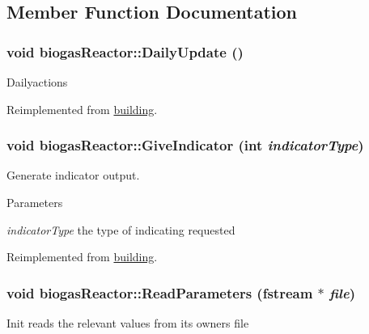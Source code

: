\subsection{Member Function Documentation}
\hypertarget{classbiogas_reactor_ae8242ee2ab7dd6495125af9720b54aa4}{
\subsubsection[{DailyUpdate}]{\setlength{\rightskip}{0pt plus 5cm}void biogasReactor::DailyUpdate ()}}
\label{classbiogas_reactor_ae8242ee2ab7dd6495125af9720b54aa4}
Dailyactions 

Reimplemented from \hyperlink{classbuilding_a584ba300427d2a648f478b68065b7a18}{building}.\hypertarget{classbiogas_reactor_ab2482d657ec9095da5aef508d0841e0e}{
\subsubsection[{GiveIndicator}]{\setlength{\rightskip}{0pt plus 5cm}void biogasReactor::GiveIndicator (int {\em indicatorType})}}
\label{classbiogas_reactor_ab2482d657ec9095da5aef508d0841e0e}


Generate indicator output. 
\begin{DoxyParams}{Parameters}
\item[{\em indicatorType}]the type of indicating requested \end{DoxyParams}


Reimplemented from \hyperlink{classbuilding_ae0e21d6fc26978c65a980676ddf4fcdf}{building}.\hypertarget{classbiogas_reactor_aafc4e774b0d67a08d3f55c566e5a58b7}{
\subsubsection[{ReadParameters}]{\setlength{\rightskip}{0pt plus 5cm}void biogasReactor::ReadParameters (fstream $\ast$ {\em file})}}
\label{classbiogas_reactor_aafc4e774b0d67a08d3f55c566e5a58b7}
Init reads the relevant values from its owners file 

